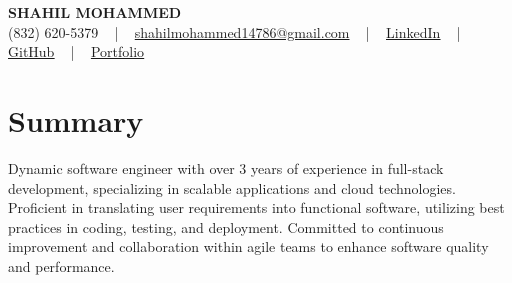 \documentclass[letterpaper,10pt]{article}
\begin{document}
\begin{center}
    {\fontsize{14pt}{12pt}\selectfont \textbf{\MakeUppercase{Shahil Mohammed}}}\\ \vspace{2pt}
    \fontsize{10pt}{12pt}\selectfont (832) 620-5379 ~ | ~ \href{mailto:shahilmohammed14786@gmail.com}{shahilmohammed14786@gmail.com} ~ | ~  
    \href{https://www.linkedin.com/in/shahil-mohammed-9652931a1/}{\color{blue}\underline{LinkedIn}}  ~ | ~ 
    \href{https://github.com/freakbeast14}{\color{blue}\underline{GitHub}} ~ | ~ 
    \href{https://shahil-mohammed.netlify.app/}{\color{blue}\underline{Portfolio}}
    \vspace{-8pt}
\end{center}

\section{Summary}
\vspace{-2pt}\fontsize{8pt}{9pt}\selectfont
Dynamic software engineer with over 3 years of experience in full-stack development, specializing in scalable applications and cloud technologies. Proficient in translating user requirements into functional software, utilizing best practices in coding, testing, and deployment. Committed to continuous improvement and collaboration within agile teams to enhance software quality and performance.
 \vspace{-5pt}
 
\vspace{-2pt}
\end{document}

